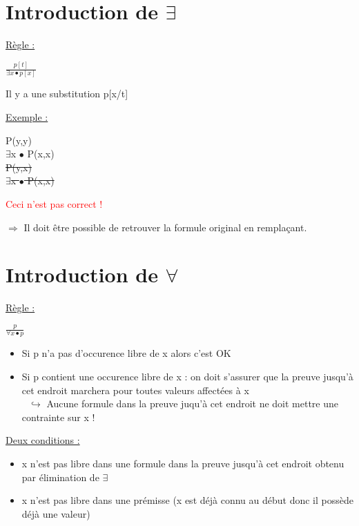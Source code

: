 \begin{flushleft}
\chapter{Introduction de $\exists$}
\underline{R\`egle :}\\
\begin{center}
{\LARGE $\frac{p[t]}{\exists x \bullet p[x]}$}
\end{center}
\begin{flushright}
Il y a une substitution p[x/t]
\end{flushright}

\underline{Exemple :}\\
\begin{center}
 P(y,y)\\
$\exists$x $\bullet$ P(x,x)\\[2\baselineskip]
\sout{P(y,x)}\\
\sout{$\exists$x $\bullet$ P(x,x)}
\begin{flushright}
\textcolor{red}{Ceci n'est pas correct !}
\end{flushright}
\end{center}
$\Rightarrow$ Il doit être possible de retrouver la formule original en remplaçant.\\

\chapter{Introduction de $\forall$}
\underline{R\`egle :}\\
\begin{center}
{\LARGE $\frac{p}{\forall x \bullet p}$}
\end{center}
\begin{itemize}
\item Si p n'a pas d'occurence libre de x alors c'est OK
\item Si p contient une occurence libre de x : on doit s'assurer que la preuve jusqu'à cet endroit marchera pour toutes valeurs affectées à x\\
$\> \> \> \hookrightarrow$ Aucune formule dans la preuve juqu'à cet endroit ne doit mettre une contrainte sur x !
\end{itemize}
\underline{Deux conditions :}\\
\begin{itemize}
\item x n'est pas libre dans une formule dans la preuve jusqu'à cet endroit obtenu par élimination de $\exists$
\item x n'est pas libre dans une prémisse (x est déjà connu au début donc il possède déjà une valeur)
\end{itemize}


\end{flushleft}

